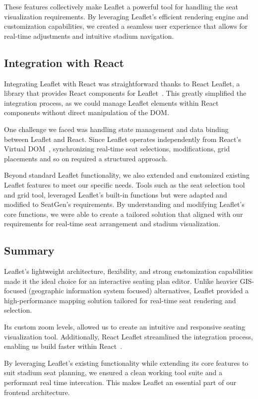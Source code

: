 These features collectively make Leaflet a powerful tool for handling the seat visualization requirements. By leveraging Leaflet’s efficient rendering engine and customization capabilities, we created a seamless user experience that allows for real-time adjustments and intuitive stadium navigation.

\subsection{Integration with React}
Integrating Leaflet with React was straightforward thanks to React Leaflet, a library that provides React components for Leaflet~\cite{ReactLeafletDocs}. This greatly simplified the integration process, as we could manage Leaflet elements within React components without direct manipulation of the DOM.

One challenge we faced was handling state management and data binding between Leaflet and React. Since Leaflet operates independently from React’s Virtual DOM~\cite{ReactLeafletDocs}, synchronizing real-time seat selections, modifications, grid placements and so on required a structured approach.

Beyond standard Leaflet functionality, we also extended and customized existing Leaflet features to meet our specific needs. Tools such as the seat selection tool and grid tool, leveraged Leaflet’s built-in functions but were adapted and modified to SeatGen’s requirements. By understanding and modifying Leaflet’s core functions, we were able to create a tailored solution that aligned with our requirements for real-time seat arrangement and stadium visualization.

\subsection{Summary}

Leaflet’s lightweight architecture, flexibility, and strong customization capabilities made it the ideal choice for an interactive seating plan editor. Unlike heavier GIS-focused (geographic information system focused) alternatives, Leaflet provided a high-performance mapping solution tailored for real-time seat rendering and selection. 

Its custom zoom levels, allowed us to create an intuitive and responsive seating visualization tool. Additionally, React Leaflet streamlined the integration process, enabling us build faster within React~\cite{ReactLeafletDocs}. 

By leveraging Leaflet’s existing functionality while extending its core features to suit stadium seat planning, we ensured a clean working tool suite and a performant real time intercation. This makes Leaflet an essential part of our frontend architecture.